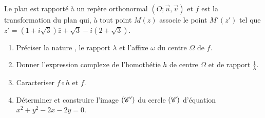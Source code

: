 \begin{exo} %
      Le plan est rapport\'e \`a un rep\`ere orthonormal $(O;\vec{u},\vec{v})$ et 
      $f$ est la transformation du plan qui, \`a tout point $M(z)$ associe le point $M'(z')$ tel que 
      $z' = (1+i\sqrt{3}) \bar{z} + \sqrt{3} - i (2 + \sqrt{3})$.
      \begin{enumerate}
            \item Pr\'eciser la nature , le rapport $\lambda$ et l'affixe $\omega$ du centre $\Omega$ de $f$.
            \item Donner l'expression complexe de l'homoth\'etie $h$ de centre $\Omega$ et de rapport $\frac{1}{\lambda}$.
            \item Caracteriser $f \circ h$ et $f$.
            \item D\'eterminer et construire l'image $(\mathscr{C}')$ du cercle $(\mathscr{C})$ d'\'equation 
                  $x^2 + y^2 - 2x - 2y = 0$.
      \end{enumerate}
\end{exo}
